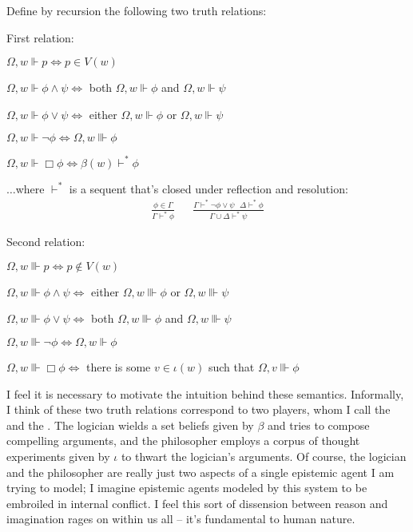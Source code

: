 \begin{definition}
  Define by recursion the following two truth relations:
  
  First relation:
  \begin{empt}
    \item $\Omega, w \Vdash p \Longleftrightarrow p \in V (w)$
    \item $\Omega, w \Vdash \phi \wedge \psi \Longleftrightarrow$ both $\Omega,
    w \Vdash \phi$ and $\Omega, w \Vdash \psi$
    \item $\Omega, w \Vdash \phi \vee \psi \Longleftrightarrow$ either $\Omega,
    w \Vdash \phi$ or $\Omega, w \Vdash \psi$
    \item $\Omega, w \Vdash \neg \phi \Longleftrightarrow \Omega, w \Vvdash
    \phi$
    \item $\Omega, w \Vdash \Box \phi \Longleftrightarrow \beta (w)
    \vdash^{\ast} \phi$
    
    $\ldots$where $\vdash^{\ast}$ is a sequent that's closed under reflection
    and resolution:
    \begin{eqnarray*}
      \frac{\phi \in \Gamma}{\Gamma \vdash^{\ast} \phi} &  & \frac{\Gamma
      \vdash^{\ast} \neg \phi \vee \psi \ \ \  \Delta \vdash^{\ast}
      \phi}{\Gamma \cup \Delta \vdash^{\ast} \psi}
    \end{eqnarray*}
  \end{empt}
  Second relation:
  \begin{empt}
    \item $\Omega, w \Vvdash p \Longleftrightarrow p \nin V (w)$
    \item $\Omega, w \Vvdash \phi \wedge \psi \Longleftrightarrow$ either $\Omega, w \Vvdash \phi$ or $\Omega, w \Vvdash \psi$
    \item $\Omega, w \Vvdash \phi \vee \psi \Longleftrightarrow$ both $\Omega,
    w \Vvdash \phi$ and $\Omega, w \Vvdash \psi$
    \item $\Omega, w \Vvdash \neg \phi \Longleftrightarrow \Omega, w \Vdash
    \phi$
    \item $\Omega, w \Vvdash \Box \phi \Longleftrightarrow$ there is some $v
    \in \iota (w)$ such that $\Omega, v \Vvdash \phi$
  \end{empt}
\end{definition}

I feel it is necessary to motivate the intuition behind these semantics.  
Informally, I think of these two truth relations correspond to two players, whom I call the
{} and the {}.   The logician wields a set
beliefs given by $\beta$ and tries to compose compelling arguments, and the
philosopher employs a corpus of thought experiments given by $\iota$ to thwart
the logician's arguments.   Of course, the logician and the philosopher are
really just two aspects of a single epistemic agent I am trying to model; I
imagine epistemic agents modeled by this system to be embroiled in internal
conflict. I feel this sort of dissension between reason and imagination rages
on within us all -- it's fundamental to human nature.

